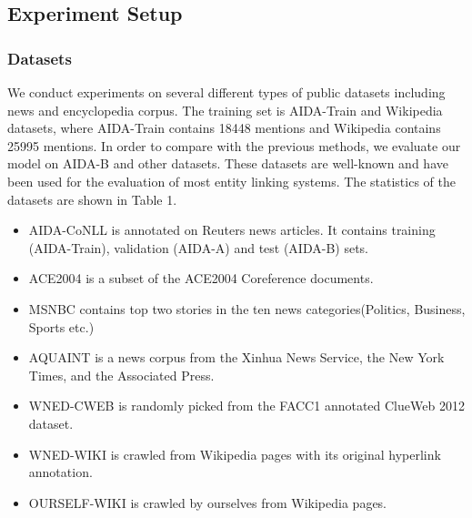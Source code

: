 \documentclass[sigconf]{acmart}
\begin{document}
\subsection{Experiment Setup}
\subsubsection*{Datasets}
We conduct experiments on several different types of public datasets including news and encyclopedia corpus. The training set is AIDA-Train and Wikipedia datasets, where AIDA-Train contains 18448 mentions and Wikipedia contains 25995 mentions. In order to compare with the previous methods, we evaluate our model on AIDA-B and other datasets. These datasets are well-known and have been used for the evaluation of most entity linking systems. The statistics of the datasets are shown in Table 1.

\begin{itemize}
\item AIDA-CoNLL \cite{HoffartYBFPSTTW11} is annotated on Reuters news articles. It contains training (AIDA-Train), validation (AIDA-A) and test (AIDA-B) sets.
\item ACE2004 \cite{RatinovRDA11} is a subset of the ACE2004 Coreference documents.
\item MSNBC \cite{Cucerzan07} contains top  two  stories  in  the  ten news categories(Politics, Business, Sports etc.)
\item AQUAINT \cite{MilneW08} is a news corpus from the Xinhua News Service, the New York Times, and the Associated Press.
\item WNED-CWEB \cite{GuoB18} is randomly picked from the FACC1 annotated ClueWeb 2012 dataset.
\item WNED-WIKI \cite{GuoB18} is crawled from Wikipedia pages with its original hyperlink annotation.
\item OURSELF-WIKI is crawled by ourselves from Wikipedia pages.
\end{itemize} 
\end{document}

